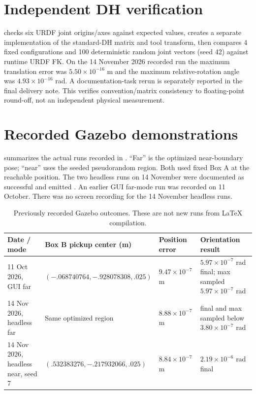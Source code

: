 \section{Independent DH verification}
 checks six URDF joint origins/axes against expected
values, creates a separate implementation of the standard-DH matrix and tool
transform, then compares 4 fixed configurations and 100 deterministic random
joint vectors (seed 42) against runtime URDF FK. On the 14 November 2026
recorded run the maximum translation error was $5.50\times10^{-16}$ m and
the maximum relative-rotation angle was $4.93\times10^{-16}$ rad. A
documentation-task rerun is separately reported in the final delivery note.
This verifies convention/matrix consistency to floating-point round-off,
not an independent physical measurement.

\section{Recorded Gazebo demonstrations}
 summarizes the actual runs recorded in
. ``Far'' is the optimized near-boundary pose; ``near''
uses the seeded pseudorandom region. Both used fixed Box A at the reachable
position. The two headless runs on 14 November were documented as successful
and emitted . An earlier GUI far-mode run was
recorded on 11 October. There was no screen recording for the 14 November
headless runs.

\begin{table}[htbp]
\centering\small
\caption{Previously recorded Gazebo outcomes. These are not new runs from
LaTeX compilation.}\label{tab:gazebo-results}
\begin{tabular}{p{}p{}p{}p{}}
\toprule Date / mode & Box B pickup center (m) & Position error & Orientation result\\\midrule
11 Oct 2026, GUI far & $(-.068740764,-.928078308,.025)$ & $9.47\times10^{-7}$ m & $5.97\times10^{-7}$ rad final; max sampled $5.97\times10^{-7}$ rad\\
14 Nov 2026, headless far & Same optimized region & $8.88\times10^{-7}$ m & final and max sampled below $3.80\times10^{-7}$ rad\\
14 Nov 2026, headless near, seed 7 & $(.532383276,-.217932066,.025)$ & $8.84\times10^{-7}$ m & $2.19\times10^{-6}$ rad final\\
\bottomrule
\end{tabular}
\end{table}

